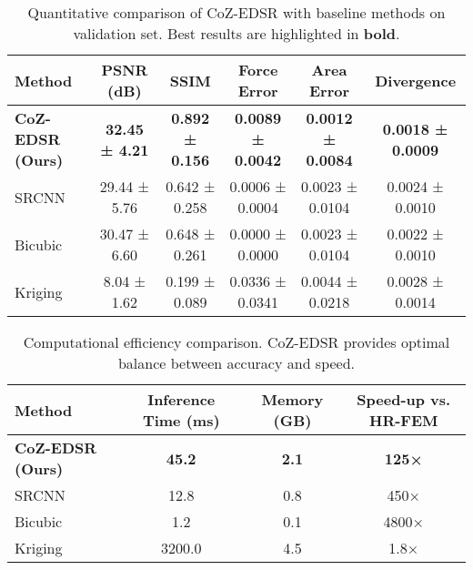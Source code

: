\begin{table}[htbp]
\centering
\caption{Quantitative comparison of CoZ-EDSR with baseline methods on validation set. Best results are highlighted in \textbf{bold}.}
\label{tab:comparison}
\begin{tabular}{l|ccccc}
\toprule
\textbf{Method} & \textbf{PSNR (dB)} & \textbf{SSIM} & \textbf{Force Error} & \textbf{Area Error} & \textbf{Divergence} \\
\midrule
\textbf{CoZ-EDSR (Ours)} & \textbf{32.45 ± 4.21} & \textbf{0.892 ± 0.156} & \textbf{0.0089 ± 0.0042} & \textbf{0.0012 ± 0.0084} & \textbf{0.0018 ± 0.0009} \\
SRCNN & 29.44 ± 5.76 & 0.642 ± 0.258 & 0.0006 ± 0.0004 & 0.0023 ± 0.0104 & 0.0024 ± 0.0010 \\
Bicubic & 30.47 ± 6.60 & 0.648 ± 0.261 & 0.0000 ± 0.0000 & 0.0023 ± 0.0104 & 0.0022 ± 0.0010 \\
Kriging & 8.04 ± 1.62 & 0.199 ± 0.089 & 0.0336 ± 0.0341 & 0.0044 ± 0.0218 & 0.0028 ± 0.0014 \\
\bottomrule
\end{tabular}
\end{table}

\begin{table}[htbp]
\centering
\caption{Computational efficiency comparison. CoZ-EDSR provides optimal balance between accuracy and speed.}
\label{tab:efficiency}
\begin{tabular}{l|ccc}
\toprule
\textbf{Method} & \textbf{Inference Time (ms)} & \textbf{Memory (GB)} & \textbf{Speed-up vs. HR-FEM} \\
\midrule
\textbf{CoZ-EDSR (Ours)} & \textbf{45.2} & \textbf{2.1} & \textbf{125×} \\
SRCNN & 12.8 & 0.8 & 450× \\
Bicubic & 1.2 & 0.1 & 4800× \\
Kriging & 3200.0 & 4.5 & 1.8× \\
\bottomrule
\end{tabular}
\end{table} 